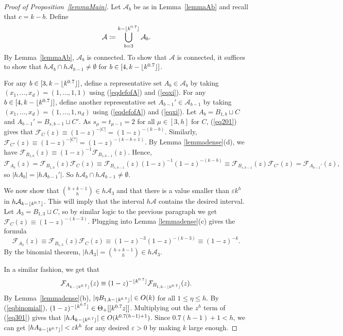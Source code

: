 \documentclass[10pt,a4paper]{article}
\theoremstyle{definition}
\theoremstyle{remark}
\numberwithin{equation}{section}
\numberwithin{theorem}{section}
\newcommand{\cala}{\mathcal{A}}
\newcommand{\calf}{\mathcal{F}}
\DeclarePairedDelimiter{\floor}{\lfloor}{\rfloor}
\begin{document}
\begin{proof}[Proof of Proposition~\ref{lemmaMain}]
Let $\cala_b$ be as in Lemma~\ref{lemmaAb} and recall that $c = k-b$. Define \[\cala \coloneq  \bigcup_{b=3}^{k-\floor{k^{0.7}}} \cala_b.\] By Lemma~\ref{lemmaAb}, $\cala_b$ is connected. To show that $\cala$ is connected, it suffices to show that $h\cala_{b} \cap h\cala_{b-1} \neq \emptyset$ for $b \in [4,k-\floor{k^{0.7}}]$. 

For any $b \in [3,k-\floor{k^{0.7}}]$, define a representative set $A_b \in \cala_b$ by taking $(x_1,\ldots,x_d) = (1,\ldots,1,1)$ using (\ref{eqdefofA}) and (\ref{eqxi}). For any $b \in [4,k-\floor{k^{0.7}}]$, define another representative set $A_{b-1}' \in \cala_{b-1}$ by taking $(x_1,\ldots,x_d) = (1,\ldots,1,n_d)$ using (\ref{eqdefofA}) and (\ref{eqxi}). Let $A_b = B_{1,b} \sqcup C$ and $A_{b-1}' = B_{s,b-1} \sqcup C'$. As ${s_\mu = t_{\mu-1} = 2}$ for all $\mu \in [3,h]$ for $C$, (\ref{eq201}) gives that $\calf_C(z) \equiv (1-z)^{-|C|} = (1-z)^{-(k-b)}$. Similarly, $\calf_{C'}(z) \equiv (1-z)^{-|C'|} = (1-z)^{-(k-b+1)}$. By Lemma \ref{lemmadense}(d), we have $\calf_{B_{1,b}}(z) \equiv (1-z)^{-1} \calf_{B_{s,b-1}}(z)$. Hence, \[\calf_{A_b}(z) = \calf_{B_{1,b}}(z) \calf_C(z) \equiv  \calf_{B_{s,b-1}}(z)(1-z)^{-1}(1-z)^{-(k-b)} \equiv \calf_{B_{s,b-1}}(z) \calf_{C'}(z)= \calf_{A_{b-1}'}(z),\] so $|hA_b| = |hA_{b-1}'|$. So $h\cala_{b} \cap h\cala_{b-1} \neq \emptyset$.

We now show that $\binom{h+k-1}{h} \in h\cala_3$ and that there is a value smaller than $\varepsilon k^h$ in $h\cala_{k-\floor{k^{0.7}}}$. This will imply that the interval $h\cala$ contains the desired interval. Let $A_3 = B_{1,3} \sqcup C$, so by similar logic to the previous paragraph we get $\calf_C(z) \equiv (1-z)^{-(k-3)}$. Plugging into Lemma \ref{lemmadense}(c) gives the formula \[\calf_{A_3}(z) \equiv \calf_{B_{1,3}}(z) \calf_C(z) \equiv (1-z)^{-3}(1-z)^{-(k-3)} \equiv (1-z)^{-k}.\] By the binomial theorem, $|hA_3| = \binom{h+k-1}{h} \in h\cala_3$. 

In a similar fashion, we get that \begin{equation}\label{eq301}
\calf_{A_{k-\floor{k^{0.7}}}}(z) \equiv (1-z)^{-\floor{k^{0.7}}}\calf_{B_{1,k-\floor{k^{0.7}}}}(z).\end{equation} By Lemma~\ref{lemmadense}(b), $|\eta B_{1,{k-\floor{k^{0.7}}}}| \in O(k)$ for all $1 \leq \eta \leq h$. By (\ref{eqbinomial}), $(1-z)^{-\floor{k^{0.7}}} \in \Theta_+[[k^{0.7}z]]$. Multiplying out the $z^h$ term of (\ref{eq301}) gives that $|hA_{k-\floor{k^{0.7}}}| \in O(k^{0.7(h-1)+1})$. Since $0.7(h-1)+1 < h$, we can get $|hA_{k-\floor{k^{0.7}}}| < \varepsilon k^h$ for any desired $\varepsilon >0$ by making $k$ large enough.
\end{proof}
\end{document}
